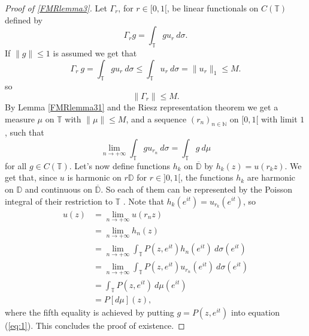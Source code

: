\documentclass[a4paper,12pt,twoside,BCOR=10mm]{scrbook}
\theoremstyle{definition}
\theoremstyle{definition}
\theoremstyle{definition}
\begin{document}
\begin{proof}[Proof of \ref{FMRlemma3}]
Let $\Gamma_r$, for $r \in [0, 1[$, be linear functionals on $C(\mathbb{T})$ defined by
\[
	\Gamma_r g = \int_{\mathbb{T}} gu_r\ d\sigma.
\]
If $\|g\| \leq 1$ is assumed we get that
\[
\Gamma_r\ g = \int_{\mathbb{T}} gu_r\ d\sigma \leq \int_{\mathbb{T}} u_r\ d\sigma = \|u_r\|_1 \leq M.
\]
so
\[
	\|\Gamma_r\| \leq M.
\]
By Lemma \ref{FMRlemma31} and the Riesz representation theorem we get a measure $\mu$ on $\mathbb{T}$ with $\|\mu\| \leq M$, and a sequence $(r_n)_{n \in \mathbb{N}}$ on $[0, 1[$ with limit $1$, such that
\begin{equation}
	\label{eq:1}
	\lim_{n \rightarrow +\infty} \int_{\mathbb{T}} gu_{r_n}\ d\sigma = \int_{\mathbb{T}}g\ d\mu
\end{equation}
for all $g \in C(\mathbb{T})$.
Let's now define functions $h_k$ on $\overline{\mathbb{D}}$ by $h_k(z) = u(r_kz)$.
We get that, since $u$ is harmonic on $r\mathbb{D}$ for $r \in ]0, 1[$, the functions $h_k$ are harmonic on $\mathbb{D}$ and continuous on $\overline{\mathbb{D}}$.
So each of them can be represented by the Poisson integral of their restriction to $\mathbb{T}$ \citep[Theroem $11.9$]{rudin2}.
Note that $h_k(e^{it}) = u_{r_k}(e^{it})$, so
\begin{align*}
	u(z)
	&= \lim_{n \rightarrow +\infty} u(r_nz)\\
	&= \lim_{n \rightarrow +\infty} h_n(z)\\
	&= \lim_{n \rightarrow +\infty} \int_{\mathbb{T}}P(z, e^{it}) h_n(e^{it})\ d\sigma(e^{it})\\
	&= \lim_{n \rightarrow +\infty} \int_{\mathbb{T}}P(z, e^{it}) u_{r_n}(e^{it})\ d\sigma(e^{it})\\
	&= \int_{\mathbb{T}}P(z, e^{it})\ d\mu(e^{it})\\
	&= P[d\mu](z),
\end{align*}
where the fifth equality is achieved by putting $g = P(z, e^{it})$ into equation (\ref{eq:1}).
This concludes the proof of existence.


\end{proof}
\end{document}
